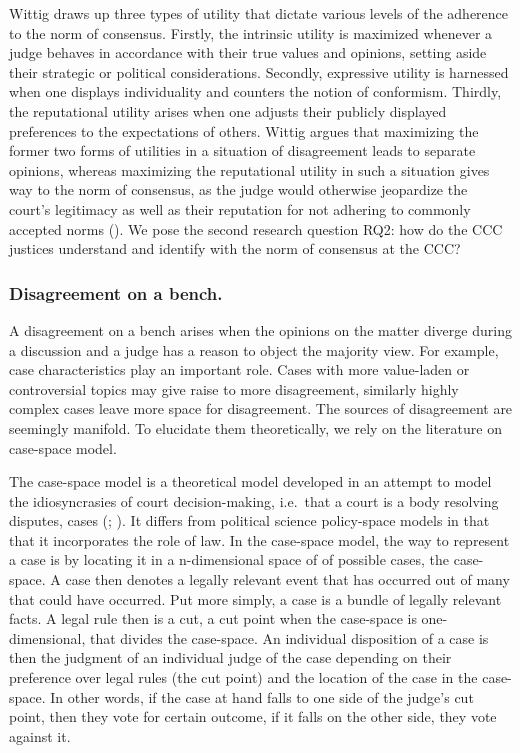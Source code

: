 \documentclass[
  11pt,
]{article}
\begin{document}
Wittig draws up three types of utility that dictate various levels of the adherence to the norm of consensus. Firstly, the intrinsic utility is maximized whenever a judge behaves in accordance with their true values and opinions, setting aside their strategic or political considerations. Secondly, expressive utility is harnessed when one displays individuality and counters the notion of conformism. Thirdly, the reputational utility arises when one adjusts their publicly displayed preferences to the expectations of others. Wittig argues that maximizing the former two forms of utilities in a situation of disagreement leads to separate opinions, whereas maximizing the reputational utility in such a situation gives way to the norm of consensus, as the judge would otherwise jeopardize the court's legitimacy as well as their reputation for not adhering to commonly accepted norms (). We pose the second research question RQ2: how do the CCC justices understand and identify with the norm of consensus at the CCC?

\subsubsection{Disagreement on a bench.}\label{disagreement-on-a-bench.}

A disagreement on a bench arises when the opinions on the matter diverge during a discussion and a judge has a reason to object the majority view. For example, case characteristics play an important role. Cases with more value-laden or controversial topics may give raise to more disagreement, similarly highly complex cases leave more space for disagreement. The sources of disagreement are seemingly manifold. To elucidate them theoretically, we rely on the literature on case-space model.

The case-space model is a theoretical model developed in an attempt to model the idiosyncrasies of court decision-making, i.e.~that a court is a body resolving disputes, cases (; ). It differs from political science policy-space models in that that it incorporates the role of law. In the case-space model, the way to represent a case is by locating it in a n-dimensional space of of possible cases, the case-space. A case then denotes a legally relevant event that has occurred out of many that could have occurred. Put more simply, a case is a bundle of legally relevant facts. A legal rule then is a cut, a cut point when the case-space is one-dimensional, that divides the case-space. An individual disposition of a case is then the judgment of an individual judge of the case depending on their preference over legal rules (the cut point) and the location of the case in the case-space. In other words, if the case at hand falls to one side of the judge's cut point, then they vote for certain outcome, if it falls on the other side, they vote against it.
\end{document}
